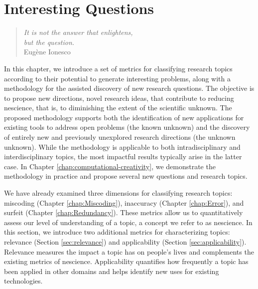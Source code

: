%
%


\chapter{Interesting Questions}
\label{chap:Interesting-Research-Questions}

\begin{quote}
\begin{flushright}
\emph{It is not the answer that enlightens,\\
but the question. \\}
Eugène Ionesco
\end{flushright}
\end{quote}
\bigskip

In this chapter, we introduce a set of metrics for classifying research topics according to their potential to generate interesting problems, along with a methodology for the assisted discovery of new research questions. The objective is to propose new directions, novel research ideas, that contribute to reducing nescience, that is, to diminishing the extent of the scientific unknown. The proposed methodology supports both the identification of new applications for existing tools to address open problems (the known unknown) and the discovery of entirely new and previously unexplored research directions (the unknown unknown). While the methodology is applicable to both intradisciplinary and interdisciplinary topics, the most impactful results typically arise in the latter case. In Chapter \ref{chap:computational-creativity}, we demonstrate the methodology in practice and propose several new questions and research topics.

We have already examined three dimensions for classifying research topics: miscoding (Chapter \ref{chap:Miscoding}), inaccuracy (Chapter \ref{chap:Error}), and surfeit (Chapter \ref{chap:Redundancy}). These metrics allow us to quantitatively assess our level of understanding of a topic, a concept we refer to as nescience. In this section, we introduce two additional metrics for characterizing topics: relevance (Section \ref{sec:relevance}) and applicability (Section \ref{sec:applicability}). Relevance measures the impact a topic has on people's lives and complements the existing metrics of nescience. Applicability quantifies how frequently a topic has been applied in other domains and helps identify new uses for existing technologies.

